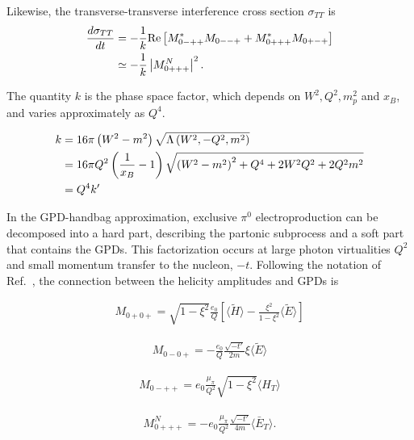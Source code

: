 \documentclass[prc,floatfix,twocolumn,superscriptaddress,letter]{revtex4}
\begin{document}
Likewise, the transverse-transverse interference cross section $\sigma_{TT}$ is
\begin{align}
\frac{d\sigma_{TT}}{dt} &= -\frac{1}{k} \text{Re} \left[ M^*_{0-++} M_{0--+} + M^*_{0+++} M_{0+-+} \right] \notag
\\ & \simeq -\frac{1}{k} \left| M^N_{0+++} \right|^2.
\label{B13}
\end{align}


The quantity $k$ is the phase space factor, which depends on $W^2, Q^2, m_p^2$ and $x_B$, and varies approximately as $Q^4$.
\begin{widetext}
\begin{align}
k		&= 16\pi \left( W^2 - m^2 \right) \sqrt{\Lambda\left(W^2, -Q^2, m^2\right)}
\\
	&= 16\pi Q^2 \left( \frac{1}{x_B} - 1 \right) \sqrt{\left( W^2-m^2 \right)^2 + Q^4 + 2W^2Q^2 +2Q^2m^2} \notag
	\\
	&= Q^4k' \notag
\end{align}
\end{widetext}












In the GPD-handbag approximation,  exclusive $\pi^0$ electroproduction can be 
decomposed into a hard part, describing the partonic subprocess and a soft part that contains the GPDs.
This factorization occurs at large photon virtualities $Q^2$ and small momentum transfer to the nucleon, $-t$.
Following the notation of Ref.~\cite{G-K-11}, the connection between the helicity amplitudes and GPDs is 

\begin{align}
M_{0+0+} = \sqrt{1-\xi^2} \frac{e_0}{Q} \left[ \langle \tilde{H} \rangle - \frac{\xi^2}{1-\xi^2} \langle \tilde{E} \rangle \right]
\end{align}

\begin{align}
M_{0-0+} = - \frac{e_0}{Q} \frac{\sqrt{-t'}}{2m} \xi \langle \tilde{E} \rangle
\end{align}

\begin{align}
M_{0-++} = e_0\frac{\mu_\pi}{Q^2}\sqrt{1-\xi^2}\langle H_T\rangle
\end{align}

\begin{align}
M^N_{0+++} = -e_0\frac{\mu_\pi}{Q^2}\frac{\sqrt{-t'}}{4m}\langle\bar{E}_T\rangle.
\end{align}
\end{document}
